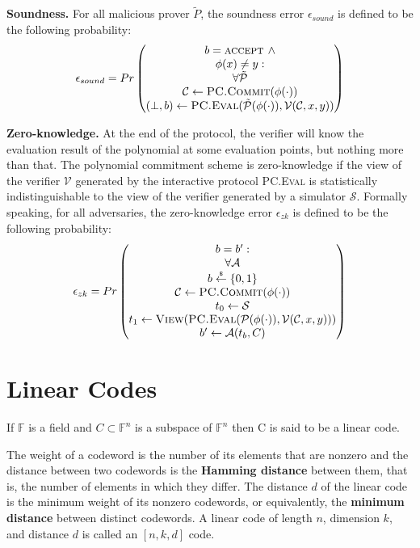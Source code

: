 \textbf{Soundness.} For all malicious prover $\tilde{P}$, the soundness error $\epsilon_{sound}$ is defined to be the following probability:
$$
\epsilon_{sound} = Pr
\begin{pmatrix}
 b = \textsc{accept } \wedge \\
 \phi(x) \neq y: \\
 \forall \tilde{\mathcal{P}} \\
 \mathcal{C} \leftarrow \textsc{PC.Commit}(\phi(\cdot)) \\
 (\perp, b)\leftarrow \textsc{PC.Eval}(\tilde{\mathcal{P}}(\phi(\cdot)), \mathcal{V}(\mathcal{C}, x, y))
\end{pmatrix}
$$



\textbf{Zero-knowledge.} At the end of the protocol, the verifier will know the evaluation result of the polynomial at some evaluation points, but nothing more than that. The polynomial commitment scheme is zero-knowledge if the view of the verifier $\mathcal{V}$ generated by the interactive protocol \textsc{PC.Eval} is statistically indistinguishable to the view of the verifier generated by a simulator $\mathcal{S}$. Formally speaking, for all adversaries, the zero-knowledge error $\epsilon_{zk}$ is defined to be the following probability:
$$
\epsilon_{zk} = Pr
\begin{pmatrix}
 b = b^\prime : \\
 \forall \mathcal{A} \\
 b \overset{{\scriptscriptstyle\$}}{\leftarrow} \{0, 1\} \\
 \mathcal{C} \leftarrow \textsc{PC.Commit}(\phi(\cdot)) \\
 t_0 \leftarrow \mathcal{S} \\
 t_1 \leftarrow \textsc{View}(\textsc{PC.Eval}(\mathcal{P}(\phi(\cdot)), \mathcal{V}(\mathcal{C}, x, y))) \\
 b^\prime \leftarrow \mathcal{A}(t_b, C)
\end{pmatrix}
$$

\section{Linear Codes}

\begin{definition}
If $\mathbb{F}$ is a field and $C \subset \mathbb{F}^n$ is a subspace of $\mathbb{F}^n$ then C is said to be a linear code.
\end{definition}

The weight of a codeword is the number of its elements that are nonzero and the distance between two codewords is the \textbf{Hamming distance} between them, that is, the number of elements in which they differ. The distance $d$ of the linear code is the minimum weight of its nonzero codewords, or equivalently, the \textbf{minimum distance} between distinct codewords. A linear code of length $n$, dimension $k$, and distance $d$ is called an $[n,k,d]$ code.

